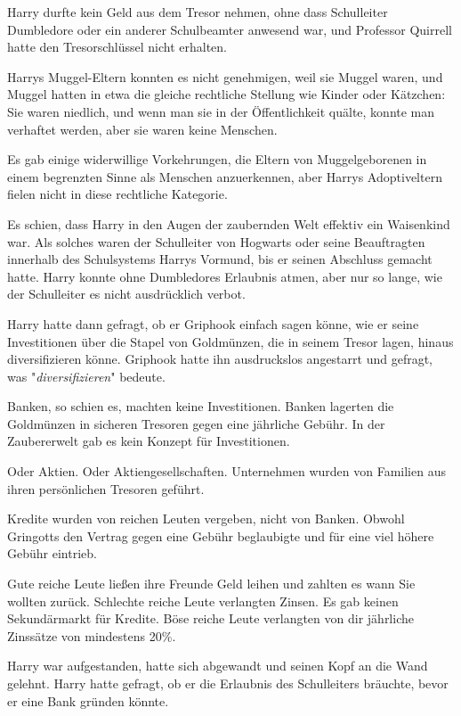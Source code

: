 {Harry durfte kein Geld aus dem Tresor nehmen, ohne dass Schulleiter Dumbledore oder ein anderer Schulbeamter anwesend war, und Professor Quirrell hatte den Tresorschlüssel nicht erhalten.

Harrys Muggel-Eltern konnten es nicht genehmigen, weil sie Muggel waren, und Muggel hatten in etwa die gleiche rechtliche Stellung wie Kinder oder Kätzchen: Sie waren niedlich, und wenn man sie in der Öffentlichkeit quälte, konnte man verhaftet werden, aber sie waren keine Menschen.

Es gab einige widerwillige Vorkehrungen, die Eltern von Muggelgeborenen in einem begrenzten Sinne als Menschen anzuerkennen, aber Harrys Adoptiveltern fielen nicht in diese rechtliche Kategorie.

Es schien, dass Harry in den Augen der zaubernden Welt effektiv ein Waisenkind war. Als solches waren der Schulleiter von Hogwarts oder seine Beauftragten innerhalb des Schulsystems Harrys Vormund, bis er seinen Abschluss gemacht hatte. Harry konnte ohne Dumbledores Erlaubnis atmen, aber nur so lange, wie der Schulleiter es nicht ausdrücklich verbot.

Harry hatte dann gefragt, ob er Griphook einfach sagen könne, wie er seine Investitionen über die Stapel von Goldmünzen, die in seinem Tresor lagen, hinaus diversifizieren könne. Griphook hatte ihn ausdruckslos angestarrt und gefragt, was "\emph{diversifizieren}" bedeute.

Banken, so schien es, machten keine Investitionen. Banken lagerten die Goldmünzen in sicheren Tresoren gegen eine jährliche Gebühr. In der Zaubererwelt gab es kein Konzept für Investitionen.

Oder Aktien. Oder Aktiengesellschaften. Unternehmen wurden von Familien aus ihren persönlichen Tresoren geführt.

Kredite wurden von reichen Leuten vergeben, nicht von Banken. Obwohl Gringotts den Vertrag gegen eine Gebühr beglaubigte und für eine viel höhere Gebühr eintrieb.

Gute reiche Leute ließen ihre Freunde Geld leihen und zahlten es wann Sie wollten zurück. Schlechte reiche Leute verlangten Zinsen. Es gab keinen Sekundärmarkt für Kredite. Böse reiche Leute verlangten von dir jährliche Zinssätze von mindestens 20\%.

Harry war aufgestanden, hatte sich abgewandt und seinen Kopf an die Wand gelehnt. Harry hatte gefragt, ob er die Erlaubnis des Schulleiters bräuchte, bevor er eine Bank gründen könnte.

}

